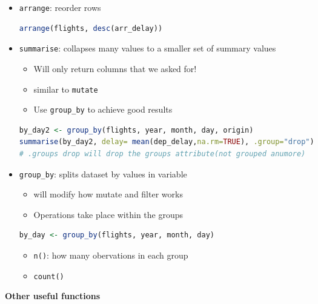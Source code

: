\documentclass{article}
\newcommand{\impt}[0]{\textcolor{red}{\textbf{[IMPT] }}}
\begin{document}
\begin{multicols}{2}
\begin{itemize}
	\begin{lstlisting}[language=R]
	# select by column
	select(flights, year, month, day)
	# select inclusive columns
	select(flights, year:day)
	select(flights, !(year:day))\end{lstlisting}
\begin{itemize}
	\item \impt \texttt{?select} for more operators
	\item \impt \texttt{select(df, where(func))}: \texttt{where} will return T/F and only select columns with specified properties (character? numeric?)
\end{itemize}
	\item \texttt{arrange}: reorder rows
\begin{lstlisting}[language=R]
arrange(flights, desc(arr_delay))
\end{lstlisting}
	\item \texttt{summarise}: collapses many values to a smaller set of summary values
	\begin{itemize}
		\item Will only return columns that we asked for!
		\item similar to \texttt{mutate}
		\item Use \texttt{group\_by} to achieve good results
	\end{itemize}
\begin{lstlisting}[language=R]
by_day2 <- group_by(flights, year, month, day, origin)
summarise(by_day2, delay= mean(dep_delay,na.rm=TRUE), .group="drop")
# .groups drop will drop the groups attribute(not grouped anumore)
\end{lstlisting}
	\item \texttt{group\_by}: splits dataset by values in variable
	\begin{itemize}
		\item will modify how mutate and filter works
		\item Operations take place within the groups
	\end{itemize}
\begin{lstlisting}[language=R]
by_day <- group_by(flights, year, month, day)
\end{lstlisting}
\begin{itemize}
	\item \texttt{n()}: how many obervations in each group
	\item \texttt{count()}
\end{itemize}
\end{itemize}
\vspace{1em}
\textbf{Other useful functions}


\end{multicols}
\end{document}
